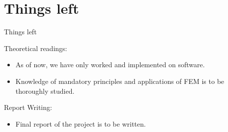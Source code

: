 \documentclass{beamer}
\begin{document}
\section{Things left}
\begin{frame}{Things left}
	
	Theoretical readings:
	\begin{itemize}
		\item As of now, we have only worked and implemented on software.
		\item Knowledge of mandatory principles and applications of FEM is to be thoroughly studied.
		
	\end{itemize}
	
	Report Writing:
	\begin{itemize}
		\item Final report of the project is to be written.
		
		
	\end{itemize}
	
\end{frame}
\end{document}
